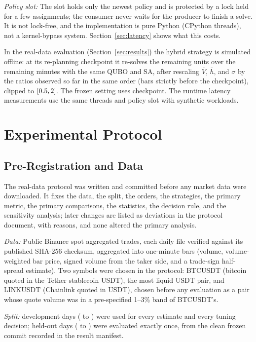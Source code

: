 \documentclass[journal]{IEEEtran}
\begin{document}
\emph{Policy slot:} The slot holds only the newest policy and is protected by a lock held for
a few assignments; the consumer never waits for the producer to finish a solve. It is not
lock-free, and the implementation is pure Python (CPython threads), not a kernel-bypass
system. Section~\ref{sec:latency} shows what this costs.

In the real-data evaluation (Section~\ref{sec:results}) the hybrid strategy is simulated
offline: at its re-planning checkpoint it re-solves the remaining units over the remaining
minutes with the same QUBO and SA, after rescaling $\bar V$, $\bar h$, and $\sigma$ by the
ratios observed so far in the same order (bars strictly before the checkpoint), clipped to
$[0.5,2]$. The frozen setting uses \TuneCheckpoints{} checkpoint. The
runtime latency measurements use the same threads and policy slot with synthetic workloads.

\section{Experimental Protocol}
\label{sec:protocol}

\subsection{Pre-Registration and Data}

The real-data protocol was written and committed before any market data were downloaded. It fixes the data, the split, the orders, the strategies, the primary metric, the primary
comparisons, the statistics, the decision rule, and the sensitivity analysis; later changes
are listed as deviations in the protocol document, with reasons, and none altered the
primary analysis.

\emph{Data:} Public Binance spot aggregated trades, each daily file verified against its
published SHA-256 checksum, aggregated into one-minute bars (volume, volume-weighted bar price, signed volume from the
taker side, and a trade-sign half-spread estimate). Two symbols were chosen in the protocol:
BTCUSDT (bitcoin quoted in the Tether stablecoin USDT), the most liquid USDT pair, and
LINKUSDT (Chainlink quoted in USDT), chosen before any evaluation as
a pair whose quote volume was in a pre-specified 1--3\% band of BTCUSDT's.

\emph{Split:} \NumDevDays{} development days (\DevFirstDay{} to \DevLastDay) were used for
every estimate and every tuning decision; \NumTestDays{} held-out days (\TestFirstDay{} to
\TestLastDay) were evaluated exactly once, from the clean frozen commit \texttt{\TestCommit}
recorded in the result manifest.
\end{document}

